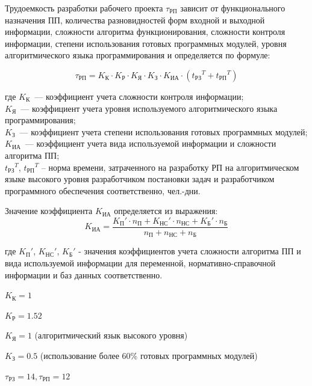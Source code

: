 Трудоемкость разработки рабочего проекта $\tau_{\text{РП}}$ зависит от функционального назначения ПП, количества разновидностей форм входной и выходной информации, сложности алгоритма функционирования, сложности контроля информации, степени использования готовых программных модулей, уровня алгоритмического языка программирования и определяется по формуле:

\begin{equation}
\tau_{\text{РП}} = K_{\text{К}} \cdot K_{\text{Р}} \cdot K_{\text{Я}} \cdot K_{\text{З}} \cdot K_{\text{ИА}} \cdot ({t_{\text{РЗ}}}^T + {t_{\text{РП}}}^T)
\label{F:tauRP}
\end{equation}

где $K_{\text{К}}$~--– коэффициент учета сложности контроля информации; \\ $K_{\text{Я}}$~--– коэффициент учета уровня используемого алгоритмического языка программирования; \\ $K_{\text{З}}$~--– коэффициент учета степени использования готовых программных модулей; \\ $K_{\text{ИА}}$~--– коэффициент учета вида используемой информации и сложности алгоритма ПП; \\ ${t_{\text{РЗ}}}^T$, ${t_{\text{РП}}}^T$ – норма времени, затраченного на разработку РП на алгоритмическом языке высокого уровня разработчиком постановки задач и разработчиком программного обеспечения соответственно, чел.-дни.

Значение коэффициента $K_{\text{ИА}}$ определяется из выражения:
\begin{equation}
K_{\text{ИА}} = \frac{{K_{\text{П}}}' \cdot n_{\text{П}} + {K_{\text{НС}}}' \cdot n_{\text{НС}} + {K_{\text{Б}}}' \cdot n_{\text{Б}}}{n_{\text{П}} + n_{\text{НС}} + n_{\text{Б}}}
\label{F:KIA}
\end{equation}

где ${K_{\text{П}}}'$, ${K_{\text{НС}}}'$, ${K_{\text{Б}}}'$ - значения коэффициентов учета сложности алгоритма ПП и вида используемой информации для переменной, нормативно-справочной информации и баз данных соответственно.

$K_{\text{К}} = 1$

$K_{\text{Р}} = 1.52$

$K_{\text{Я}} = 1$ (алгоритмический язык высокого уровня)

$K_{\text{З}} = 0.5$ (использование более 60\% готовых программных модулей)

$\tau_{\text{РЗ}} = 14, \tau_{\text{РП}} = 12$

